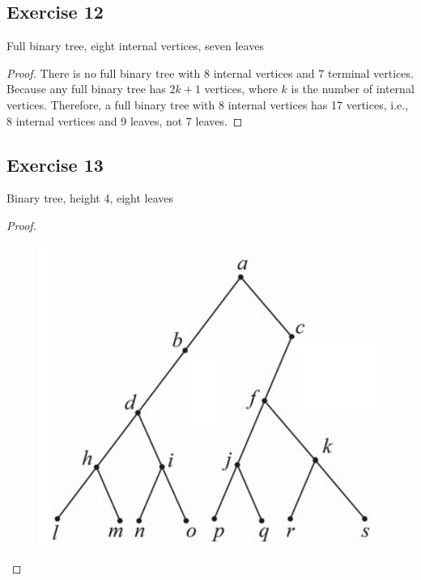 \documentclass[14pt]{extarticle}
\begin{document}
\subsection{Exercise 12}
Full binary tree, eight internal vertices, seven leaves
\begin{proof}
    There is no full binary tree with 8 internal vertices and 7 terminal vertices. Because any full binary tree has \(2k+1\)
    vertices, where \(k\) is the number of internal vertices. Therefore, a full binary tree with 8 internal vertices has 17
    vertices, i.e., 8 internal vertices and 9 leaves, not 7 leaves.
\end{proof}

\subsection{Exercise 13}
Binary tree, height 4, eight leaves
\begin{proof}
    \begin{figure}[ht!]
        \centering
        \includegraphics[scale=0.2]{../images/10.5.13.png}
    \end{figure}
\end{proof}
\end{document}
